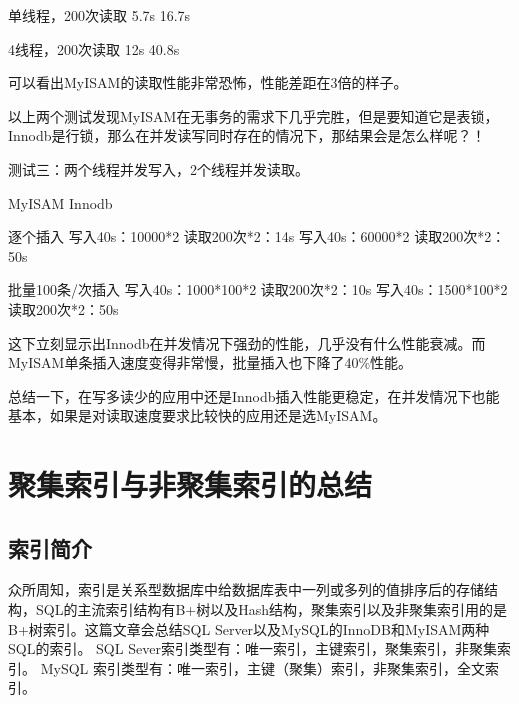 \documentclass[UTF8]{ctexart}
\begin{document}
单线程，200次读取         5.7s
          16.7s

4线程，200次读取          12s
           40.8s

可以看出MyISAM的读取性能非常恐怖，性能差距在3倍的样子。

以上两个测试发现MyISAM在无事务的需求下几乎完胜，但是要知道它是表锁，Innodb是行锁，那么在并发读写同时存在的情况下，那结果会是怎么样呢？！

测试三：两个线程并发写入，2个线程并发读取。

 
                      MyISAM                                 Innodb

逐个插入                写入40s：10000*2
 读取200次*2：14s        写入40s：60000*2
 读取200次*2：50s

批量100条/次插入        写入40s：1000*100*2 读取200次*2：10s      写入40s：1500*100*2 读取200次*2：50s

这下立刻显示出Innodb在并发情况下强劲的性能，几乎没有什么性能衰减。而MyISAM单条插入速度变得非常慢，批量插入也下降了40\%性能。

总结一下，在写多读少的应用中还是Innodb插入性能更稳定，在并发情况下也能基本，如果是对读取速度要求比较快的应用还是选MyISAM。
\section{聚集索引与非聚集索引的总结}
\subsection{索引简介}
众所周知，索引是关系型数据库中给数据库表中一列或多列的值排序后的存储结构，SQL的主流索引结构有B+树以及Hash结构，聚集索引以及非聚集索引用的是B+树索引。这篇文章会总结SQL Server以及MySQL的InnoDB和MyISAM两种 SQL的索引。
SQL Sever索引类型有：唯一索引，主键索引，聚集索引，非聚集索引。
MySQL 索引类型有：唯一索引，主键（聚集）索引，非聚集索引，全文索引。
\end{document}
